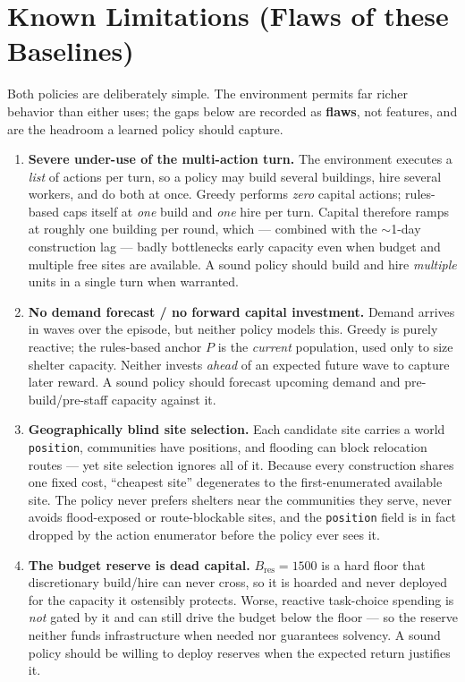 \documentclass[11pt]{article}
\newcommand{\code}[1]{{\texttt{\small #1}}}
\begin{document}
\section{Known Limitations (Flaws of these Baselines)}
\label{sec:limits}

Both policies are deliberately simple. The environment permits far richer behavior than either uses;
the gaps below are recorded as \textcolor{flagred}{\textbf{flaws}}, not features, and are the headroom
a learned policy should capture.

\begin{enumerate}[leftmargin=1.6em, itemsep=4pt]
\item \textcolor{flagred}{\textbf{Severe under-use of the multi-action turn.}} The environment
executes a \emph{list} of actions per turn, so a policy may build several buildings, hire several
workers, and do both at once. Greedy performs \emph{zero} capital actions; rules-based caps itself
at \emph{one} build and \emph{one} hire per turn. Capital therefore ramps at roughly one building
per round, which --- combined with the $\sim$1-day construction lag --- badly bottlenecks early
capacity even when budget and multiple free sites are available. A sound policy should build and
hire \emph{multiple} units in a single turn when warranted.

\item \textcolor{flagred}{\textbf{No demand forecast / no forward capital investment.}} Demand
arrives in waves over the episode, but neither policy models this. Greedy is purely reactive; the
rules-based anchor $P$ is the \emph{current} population, used only to size shelter capacity. Neither
invests \emph{ahead} of an expected future wave to capture later reward. A sound policy should
forecast upcoming demand and pre-build/pre-staff capacity against it.

\item \textcolor{flagred}{\textbf{Geographically blind site selection.}} Each candidate site
carries a world \code{position}, communities have positions, and flooding can block relocation
routes --- yet site selection ignores all of it. Because every construction shares one fixed cost,
``cheapest site'' degenerates to the first-enumerated available site. The policy never prefers
shelters near the communities they serve, never avoids flood-exposed or route-blockable sites, and
the \code{position} field is in fact dropped by the action enumerator before the policy ever sees it.

\item \textcolor{flagred}{\textbf{The budget reserve is dead capital.}} $B_{\mathrm{res}}=1500$ is a
hard floor that discretionary build/hire can never cross, so it is hoarded and never deployed for
the capacity it ostensibly protects. Worse, reactive task-choice spending is \emph{not} gated by it
and can still drive the budget below the floor --- so the reserve neither funds infrastructure when
needed nor guarantees solvency. A sound policy should be willing to deploy reserves when the
expected return justifies it.
\end{enumerate}
\end{document}
